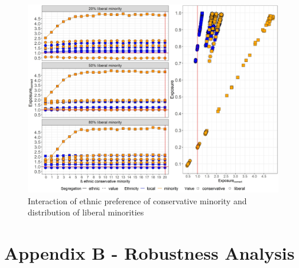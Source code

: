 \documentclass{article}
\begin{document}
\begin{figure}[H]
    \centering
    \includegraphics[scale=0.5]{material/figures/etcnmn.jpg}
    \caption{Interaction of ethnic preference of conservative minority and distribution of liberal minorities}
    \label{fig:etcnmn}
\end{figure} %

\section*{Appendix B - Robustness Analysis}
\end{document}
